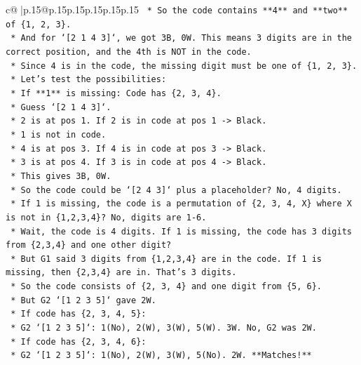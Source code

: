 \documentclass{article}
\begin{document}
{\begin{supertabular}{c@{$\;$}|p{.15\linewidth}@{}p{.15\linewidth}p{.15\linewidth}p{.15\linewidth}p{.15\linewidth}p{.15\linewidth}}
{{{\texttt{    *   So the code contains **4** and **two** of \{1, 2, 3\}.} \\
\texttt{    *   And for `{[}2 1 4 3{]}`, we got 3B, 0W. This means 3 digits are in the correct position, and the 4th is NOT in the code.} \\
\texttt{    *   Since 4 is in the code, the missing digit must be one of \{1, 2, 3\}.} \\
\texttt{    *   Let's test the possibilities:} \\
\texttt{        *   If **1** is missing: Code has \{2, 3, 4\}.} \\
\texttt{            *   Guess `{[}2 1 4 3{]}`.} \\
\texttt{            *   2 is at pos 1. If 2 is in code at pos 1 {-}> Black.} \\
\texttt{            *   1 is not in code.} \\
\texttt{            *   4 is at pos 3. If 4 is in code at pos 3 {-}> Black.} \\
\texttt{            *   3 is at pos 4. If 3 is in code at pos 4 {-}> Black.} \\
\texttt{            *   This gives 3B, 0W.} \\
\texttt{            *   So the code could be `{[}2 4 3{]}` plus a placeholder? No, 4 digits.} \\
\texttt{            *   If 1 is missing, the code is a permutation of \{2, 3, 4, X\} where X is not in \{1,2,3,4\}? No, digits are 1{-}6.} \\
\texttt{            *   Wait, the code is 4 digits. If 1 is missing, the code has 3 digits from \{2,3,4\} and one other digit?} \\
\texttt{            *   But G1 said 3 digits from \{1,2,3,4\} are in the code. If 1 is missing, then \{2,3,4\} are in. That's 3 digits.} \\
\texttt{            *   So the code consists of \{2, 3, 4\} and one digit from \{5, 6\}.} \\
\texttt{            *   But G2 `{[}1 2 3 5{]}` gave 2W.} \\
\texttt{                *   If code has \{2, 3, 4, 5\}:} \\
\texttt{                    *   G2 `{[}1 2 3 5{]}`: 1(No), 2(W), 3(W), 5(W). 3W. No, G2 was 2W.} \\
\texttt{                *   If code has \{2, 3, 4, 6\}:} \\
\texttt{                    *   G2 `{[}1 2 3 5{]}`: 1(No), 2(W), 3(W), 5(No). 2W. **Matches!**} \\
}}}
\end{supertabular}}
\end{document}
